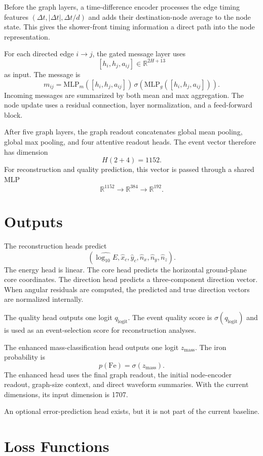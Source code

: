 \documentclass[a4paper,10pt]{article}
\newcommand{\R}{\mathbb{R}}
\begin{document}
Before the graph layers, a time-difference encoder processes the edge timing features
$(\Delta t,|\Delta t|,\Delta t/d)$
and adds their destination-node average to the node state.
This gives the shower-front timing information a direct path into the node representation.

For each directed edge $i\rightarrow j$, the gated message layer uses
\[
  [h_i,h_j,a_{ij}]\in\R^{2H+13}
\]
as input.
The message is
\[
  m_{ij}=
  \mathrm{MLP}_m([h_i,h_j,a_{ij}])\,
  \sigma(\mathrm{MLP}_g([h_i,h_j,a_{ij}])).
\]
Incoming messages are summarized by both mean and max aggregation.
The node update uses a residual connection, layer normalization, and a feed-forward block.

After five graph layers, the graph readout concatenates global mean pooling, global max pooling, and four attentive readout heads.
The event vector therefore has dimension
\[
  H(2+4)=1152.
\]
For reconstruction and quality prediction, this vector is passed through a shared MLP
\[
  \R^{1152}\rightarrow\R^{384}\rightarrow\R^{192}.
\]

\section{Outputs}

The reconstruction heads predict
\[
(\widehat{\log_{10}E},\hat{x}_c,\hat{y}_c,\hat{n}_x,\hat{n}_y,\hat{n}_z).
\]
The energy head is linear.
The core head predicts the horizontal ground-plane core coordinates.
The direction head predicts a three-component direction vector.
When angular residuals are computed, the predicted and true direction vectors are normalized internally.

The quality head outputs one logit $q_{\mathrm{logit}}$.
The event quality score is $\sigma(q_{\mathrm{logit}})$ and is used as an event-selection score for reconstruction analyses.

The enhanced mass-classification head outputs one logit $z_{\mathrm{mass}}$.
The iron probability is
\[
  p(\mathrm{Fe})=\sigma(z_{\mathrm{mass}}).
\]
The enhanced head uses the final graph readout, the initial node-encoder readout, graph-size context, and direct waveform summaries.
With the current dimensions, its input dimension is 1707.

An optional error-prediction head exists, but it is not part of the current baseline.

\section{Loss Functions}
\end{document}
